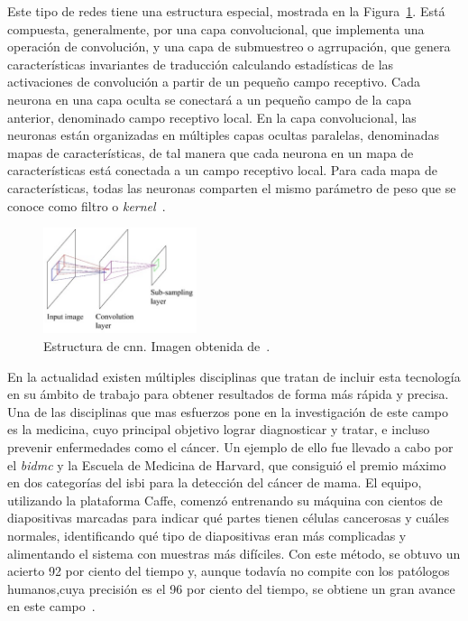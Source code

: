 Este tipo de redes tiene una estructura especial, mostrada en la Figura~\ref{fig.cnn}. Está compuesta, generalmente, por una capa convolucional, que implementa una operación de convolución, y una capa de submuestreo o agrrupación, que genera características invariantes de traducción calculando estadísticas de las activaciones de convolución a partir de un pequeño campo receptivo. Cada neurona en una capa oculta se conectará a un pequeño campo de la capa anterior, denominado campo receptivo local. En la capa convolucional, las neuronas están organizadas en múltiples capas ocultas paralelas, denominadas mapas de características, de tal manera que cada neurona en un mapa de características está conectada a un campo receptivo local. Para cada mapa de características, todas las neuronas comparten el mismo parámetro de peso que se conoce como filtro o \textit{kernel}~\cite{cnn}.

\begin{figure}[H]
	\begin{center}
		\includegraphics[width=0.4\textwidth]{figures/cnn}
		\caption{Estructura de \acrshort{cnn}. Imagen obtenida de~\cite{cnn}.}
		\label{fig.cnn}
	\end{center}
\end{figure}

En la actualidad existen múltiples disciplinas que tratan de incluir esta tecnología en su ámbito de trabajo para obtener resultados de forma más rápida y precisa. Una de las disciplinas que mas esfuerzos pone en la investigación de este campo es la medicina, cuyo principal objetivo lograr diagnosticar y tratar, e incluso prevenir enfermedades como el cáncer. Un ejemplo de ello fue llevado a cabo por el \textit{\acrfull{bidmc}} y la Escuela de Medicina de Harvard, que consiguió el premio máximo en dos categorías del \acrfull{isbi} para la detección del cáncer de mama. El equipo, utilizando la plataforma Caffe, comenzó entrenando su máquina con cientos de diapositivas marcadas para indicar qué partes tienen células cancerosas y cuáles normales, identificando qué tipo de diapositivas eran más complicadas y alimentando el sistema con muestras más difíciles. Con este método, se obtuvo un acierto 92 por ciento del tiempo y, aunque todavía no compite con los patólogos humanos,cuya precisión es el 96 por ciento del tiempo, se obtiene un gran avance en este campo~\cite{2016arXiv160605718W}.\\

